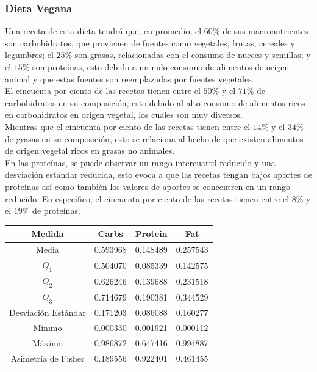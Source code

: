 \documentclass[12pt,a4paper]{article}
\begin{document}
        \subsubsection{Dieta Vegana}

            Una receta de esta dieta tendrá que, en promedio, el $60\%$ de 
            sus macronutrientes son carbohidratos, que provienen de fuentes 
            como vegetales, frutas, cereales y legumbres; el $25\%$ son grasas, 
            relacionadas con el consumo de nueces y semillas; y el $15\%$ son 
            proteínas, esto debido a un nulo consumo de alimentos de origen 
            animal y que estas fuentes son reemplazadas por fuentes vegetales.\\

            El cincuenta por ciento de las recetas tienen entre el $50\%$ y el $71\%$ 
            de carbohidratos en su composición, esto debido al alto consumo de 
            alimentos ricos en carbohidratos en origen vegetal, los cuales son 
            muy diversos.\\

            Mientras que el cincuenta por ciento de las recetas tienen entre el $14\%$ y 
            el $34\%$ de grasas en su composición, esto se relaciona al hecho de que 
            existen alimentos de origen vegetal ricos en grasas no animales.\\
            
            En las proteínas, se puede observar un rango intercuartil reducido y una 
            desviación estándar reducida, esto evoca a que las recetas tengan bajos 
            aportes de proteínas así como también los valores de aportes se concentren 
            en un rango reducido. En específico, el cincuenta por ciento de las recetas 
            tienen entre el $8\%$ y el $19\%$ de proteínas.

            \begin{center}
                \begin{tabular}{|c|ccc|}
                    \hline
                    Medida & Carbs & Protein & Fat \\
                    \hline
                    Media               & 0.593968 & 0.148489 & 0.257543  \\
                    $Q_1$               & 0.504070 & 0.085339 & 0.142575  \\
                    $Q_2$               & 0.626246 & 0.139688 & 0.231518  \\
                    $Q_3$               & 0.714679 & 0.190381 & 0.344529  \\
                    Desviación Estándar & 0.171203 & 0.086088 & 0.160277  \\
                    Mínimo              & 0.000330 & 0.001921 & 0.000112  \\
                    Máximo              & 0.986872 & 0.647416 & 0.994887  \\
                    Asimetría de Fisher & 0.189556 & 0.922401 & 0.461455  \\
                    \hline
                \end{tabular}
            \end{center}
\end{document}
